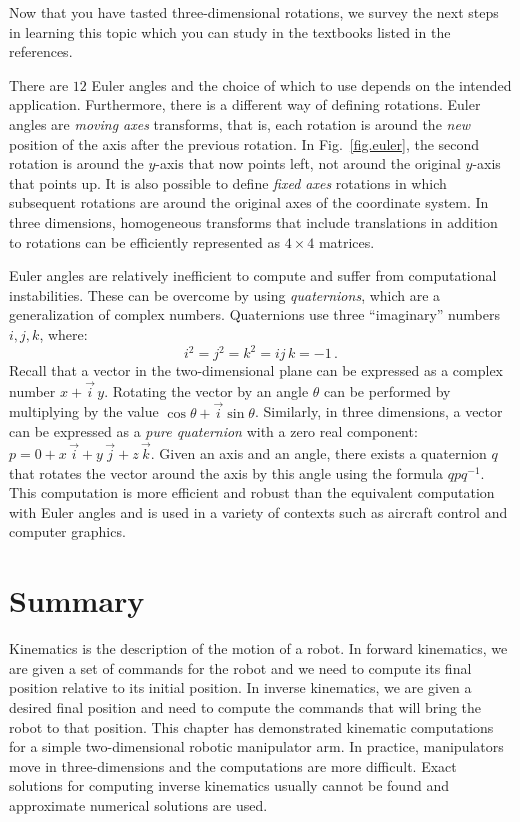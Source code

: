 Now that you have tasted three-dimensional rotations, we survey the next steps in learning this topic which you can study in the textbooks listed in the references.

There are $12$ Euler angles and the choice of which to use depends on the intended application. Furthermore, there is a different way of defining rotations. Euler angles are \emph{moving axes} transforms, that is, each rotation is around the \emph{new} position of the axis after the previous rotation. In Fig.~\ref{fig.euler}, the second rotation is around the $y$-axis that now points left, not around the original $y$-axis that points up. It is also possible to define \emph{fixed axes} rotations in which subsequent rotations are around the original axes of the coordinate system. In three dimensions, homogeneous transforms that include translations in addition to rotations can be efficiently represented as $4\times 4$ matrices.

Euler angles are relatively inefficient to compute and suffer from computational instabilities. These can be overcome by using \emph{quaternions}, which are a generalization of complex numbers. Quaternions use three ``imaginary'' numbers $i,j,k$, where:
\[
i^2 = j^2 = k^2 = ij\,k = -1\,.
\]
Recall that a vector in the two-dimensional plane can be expressed as a complex number $x+\vec{i}\,y$. Rotating the vector by an angle $\theta$ can be performed by multiplying by the value $\cos \theta + \vec{i} \sin \theta$.  Similarly, in three dimensions, a vector can be expressed as a \emph{pure quaternion} with a zero real component: $p=0+x\,\vec{i} + y\,\vec{j} + z\,\vec{k}$. Given an axis and an angle, there exists a quaternion $q$ that rotates the vector around the axis by this angle using the formula $qpq^{-1}$. This computation is more efficient and robust than the equivalent computation with Euler angles and is used in a variety of contexts such as aircraft control and computer graphics.


\section{Summary}

Kinematics is the description of the motion of a robot. In forward kinematics, we are given a set of commands for the robot and we need to compute its final position relative to its initial position. In inverse kinematics, we are given a desired final position and need to compute the commands that will bring the robot to that position. This chapter has demonstrated kinematic computations for a simple two-dimensional robotic manipulator arm. In practice, manipulators move in three-dimensions and the computations are more difficult. Exact solutions for computing inverse kinematics usually cannot be found and approximate numerical solutions are used.


